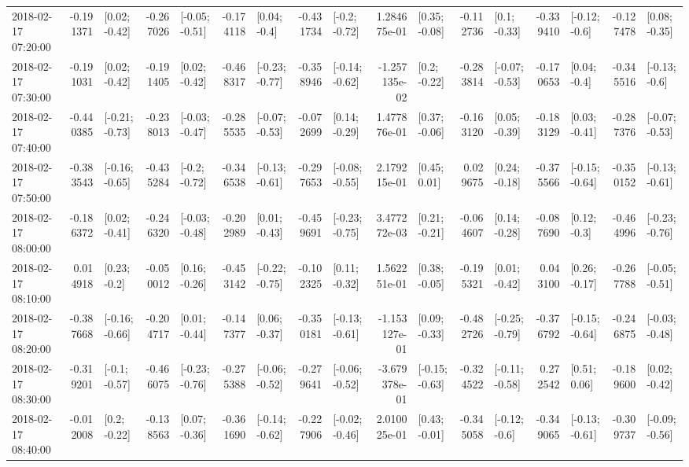 \begin{tabular}{lrlrlrlrlrlrlrlrl}
2018-02-17 07:20:00 & -0.191371 &   [0.02; -0.42] & -0.267026 &  [-0.05; -0.51] & -0.174118 &    [0.04; -0.4] & -0.431734 &   [-0.2; -0.72] &  1.284675e-01 &   [0.35; -0.08] & -0.112736 &    [0.1; -0.33] & -0.339410 &   [-0.12; -0.6] & -0.127478 &   [0.08; -0.35] \\
2018-02-17 07:30:00 & -0.191031 &   [0.02; -0.42] & -0.191405 &   [0.02; -0.42] & -0.468317 &  [-0.23; -0.77] & -0.358946 &  [-0.14; -0.62] & -1.257135e-02 &    [0.2; -0.22] & -0.283814 &  [-0.07; -0.53] & -0.170653 &    [0.04; -0.4] & -0.345516 &   [-0.13; -0.6] \\
2018-02-17 07:40:00 & -0.440385 &  [-0.21; -0.73] & -0.238013 &  [-0.03; -0.47] & -0.285535 &  [-0.07; -0.53] & -0.072699 &   [0.14; -0.29] &  1.477876e-01 &   [0.37; -0.06] & -0.163120 &   [0.05; -0.39] & -0.183129 &   [0.03; -0.41] & -0.287376 &  [-0.07; -0.53] \\
2018-02-17 07:50:00 & -0.383543 &  [-0.16; -0.65] & -0.435284 &   [-0.2; -0.72] & -0.346538 &  [-0.13; -0.61] & -0.297653 &  [-0.08; -0.55] &  2.179215e-01 &    [0.45; 0.01] &  0.029675 &   [0.24; -0.18] & -0.375566 &  [-0.15; -0.64] & -0.350152 &  [-0.13; -0.61] \\
2018-02-17 08:00:00 & -0.186372 &   [0.02; -0.41] & -0.246320 &  [-0.03; -0.48] & -0.202989 &   [0.01; -0.43] & -0.459691 &  [-0.23; -0.75] &  3.477272e-03 &   [0.21; -0.21] & -0.064607 &   [0.14; -0.28] & -0.087690 &    [0.12; -0.3] & -0.464996 &  [-0.23; -0.76] \\
2018-02-17 08:10:00 &  0.014918 &    [0.23; -0.2] & -0.050012 &   [0.16; -0.26] & -0.453142 &  [-0.22; -0.75] & -0.102325 &   [0.11; -0.32] &  1.562251e-01 &   [0.38; -0.05] & -0.195321 &   [0.01; -0.42] &  0.043100 &   [0.26; -0.17] & -0.267788 &  [-0.05; -0.51] \\
2018-02-17 08:20:00 & -0.387668 &  [-0.16; -0.66] & -0.204717 &   [0.01; -0.44] & -0.147377 &   [0.06; -0.37] & -0.350181 &  [-0.13; -0.61] & -1.153127e-01 &   [0.09; -0.33] & -0.482726 &  [-0.25; -0.79] & -0.376792 &  [-0.15; -0.64] & -0.246875 &  [-0.03; -0.48] \\
2018-02-17 08:30:00 & -0.319201 &   [-0.1; -0.57] & -0.466075 &  [-0.23; -0.76] & -0.275388 &  [-0.06; -0.52] & -0.279641 &  [-0.06; -0.52] & -3.679378e-01 &  [-0.15; -0.63] & -0.324522 &  [-0.11; -0.58] &  0.272542 &    [0.51; 0.06] & -0.189600 &   [0.02; -0.42] \\
2018-02-17 08:40:00 & -0.012008 &    [0.2; -0.22] & -0.138563 &   [0.07; -0.36] & -0.361690 &  [-0.14; -0.62] & -0.227906 &  [-0.02; -0.46] &  2.010025e-01 &   [0.43; -0.01] & -0.345058 &   [-0.12; -0.6] & -0.349065 &  [-0.13; -0.61] & -0.309737 &  [-0.09; -0.56] \\

\end{tabular}
